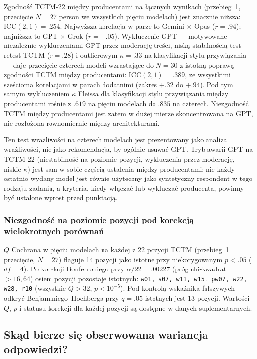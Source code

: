 \documentclass[11pt,a4paper]{article}
\begin{document}
Zgodność TCTM-22 między producentami na łącznych wynikach (przebieg~1, przecięcie $N = 27$ person we wszystkich pięciu modelach) jest znacznie niższa: ICC$(2, 1) = .254$. Najwyższa korelacja w parze to Gemini $\times$ Opus ($r = .94$); najniższa to GPT $\times$ Grok ($r = -.05$). Wykluczenie GPT --- motywowane niezależnie wykluczeniami GPT przez moderację treści, niską stabilnością test--retest TCTM ($r = .28$) i outlierowym $\kappa = .33$ na klasyfikacji stylu przywiązania --- daje przecięcie czterech modeli wzrastające do $N = 30$ z istotną poprawą zgodności TCTM między producentami: ICC$(2, 1) = .389$, ze wszystkimi sześcioma korelacjami w parach dodatnimi (zakres $+.32$ do $+.94$). Pod tym samym wykluczeniem $\kappa$ Fleissa dla klasyfikacji stylu przywiązania między producentami rośnie z $.619$ na pięciu modelach do $.835$ na czterech. Niezgodność TCTM między producentami jest zatem w dużej mierze skoncentrowana na GPT, nie rozłożona równomiernie między architekturami.

Ten test wrażliwości na czterech modelach jest prezentowany jako analiza wrażliwości, nie jako rekomendacja, by ogólnie usuwać GPT. Tryb awarii GPT na TCTM-22 (niestabilność na poziomie pozycji, wykluczenia przez moderację, niskie $\kappa$) jest sam w sobie częścią ustalenia między producentami: nie każdy ostatnio wydany model jest równie użyteczny jako syntetyczny respondent w tego rodzaju zadaniu, a kryteria, kiedy włączać lub wykluczać producenta, powinny być ustalone wprost przed punktacją.

\subsubsection*{Niezgodność na poziomie pozycji pod korekcją wielokrotnych porównań}

$Q$ Cochrana w pięciu modelach na każdej z 22 pozycji TCTM (przebieg~1 przecięcie, $N = 27$) flaguje 14 pozycji jako istotne przy niekorygowanym $p < .05$ ($df = 4$). Po korekcji Bonferroniego przy $\alpha / 22 = .00227$ (próg chi-kwadrat $> 16{,}64$) osiem pozycji pozostaje istotnych: \texttt{w01, s07, w11, w15, pw07, w22, w28, r10} (wszystkie $Q > 32$, $p < 10^{-5}$). Pod kontrolą wskaźnika fałszywych odkryć Benjaminiego--Hochberga przy $q = .05$ istotnych jest 13 pozycji. Wartości $Q$, $p$ i statusu korekcji dla każdej pozycji są dostępne w danych suplementarnych.

\subsection{Skąd bierze się obserwowana wariancja odpowiedzi?}\label{sec:wariancja}
\end{document}
